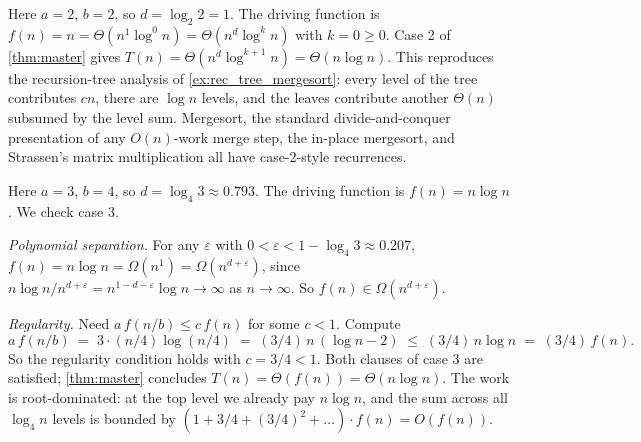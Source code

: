 \begin{example}[Master theorem case 2: $T(n) = 2T(n/2) + n$ (mergesort)]
\label{ex:mt_case2}
Here $a = 2$, $b = 2$, so $d = \log_2 2 = 1$. The driving function is $f(n) = n = \Theta(n^1 \log^0 n) = \Theta(n^d \log^k n)$ with $k = 0 \ge 0$. Case 2 of \cref{thm:master} gives $T(n) = \Theta(n^d \log^{k+1} n) = \Theta(n \log n)$. This reproduces the recursion-tree analysis of \cref{ex:rec_tree_mergesort}: every level of the tree contributes $cn$, there are $\log n$ levels, and the leaves contribute another $\Theta(n)$ subsumed by the level sum. Mergesort, the standard divide-and-conquer presentation of any $O(n)$-work merge step, the in-place mergesort, and Strassen's matrix multiplication all have case-2-style recurrences.
\end{example}

\begin{example}[Master theorem case 3: $T(n) = 3T(n/4) + n \log n$]
\label{ex:mt_case3}
Here $a = 3$, $b = 4$, so $d = \log_4 3 \approx 0.793$. The driving function is $f(n) = n \log n$. We check case 3.

\medskip
\noindent\textit{Polynomial separation.} For any $\varepsilon$ with $0 < \varepsilon < 1 - \log_4 3 \approx 0.207$, $f(n) = n \log n = \Omega(n^{1}) = \Omega(n^{d + \varepsilon})$, since $n \log n / n^{d+\varepsilon} = n^{1 - d - \varepsilon} \log n \to \infty$ as $n \to \infty$. So $f(n) \in \Omega(n^{d + \varepsilon})$.

\medskip
\noindent\textit{Regularity.} Need $a\,f(n/b) \le c\,f(n)$ for some $c < 1$. Compute
\[
  a\,f(n/b) \;=\; 3 \cdot (n/4) \log(n/4) \;=\; (3/4)\,n\,(\log n - 2) \;\le\; (3/4)\,n \log n \;=\; (3/4)\,f(n).
\]
So the regularity condition holds with $c = 3/4 < 1$. Both clauses of case 3 are satisfied; \cref{thm:master} concludes $T(n) = \Theta(f(n)) = \Theta(n \log n)$. The work is root-dominated: at the top level we already pay $n \log n$, and the sum across all $\log_4 n$ levels is bounded by $(1 + 3/4 + (3/4)^2 + \dots) \cdot f(n) = O(f(n))$.
\end{example}

